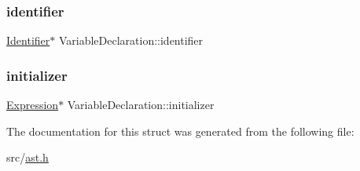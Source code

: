 \subsubsection{\texorpdfstring{identifier}{identifier}}
{\footnotesize\ttfamily \hyperlink{struct_identifier}{Identifier}$\ast$ Variable\+Declaration\+::identifier}

\mbox{\label{struct_variable_declaration_a472faa13a27b5cc06125787259116a2f}} 
\subsubsection{\texorpdfstring{initializer}{initializer}}
{\footnotesize\ttfamily \hyperlink{struct_expression}{Expression}$\ast$ Variable\+Declaration\+::initializer}



The documentation for this struct was generated from the following file\+:\begin{DoxyCompactItemize}
\item 
src/\hyperlink{ast_8h}{ast.\+h}\end{DoxyCompactItemize}
